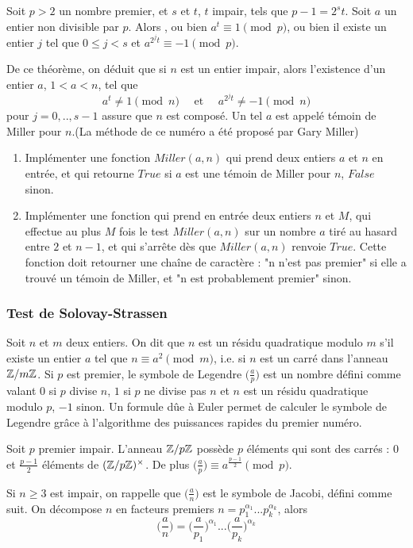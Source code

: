 \begin{thm} Soit $p>2$ un nombre premier, et $s$ et $t$, $t$ impair, tels que $p-1=2^s t $. Soit $a$ un entier non divisible par $p$. Alors , ou bien $a^t \equiv 1\pmod p$, ou bien il existe un entier $j$ tel que $0\leq j < s $ et $a^{2^j t} \equiv -1\pmod p$.
\end{thm}
De ce théorème, on déduit que si $n$ est un entier impair, alors l'existence d'un entier $a$, $1<a<n$, tel que 
\[a^t\neq 1\pmod n \quad\text{ et }\quad a^{2^j t}\neq -1\pmod n\]
pour $j=0,..,s-1$ assure que $n$ est composé. Un tel $a$ est appelé témoin de Miller pour $n$.(La méthode de ce numéro a été proposé par Gary Miller)
\begin{enumerate}
\item Implémenter une fonction $Miller(a,n)$ qui prend deux entiers $a$ et $n$ en entrée, et qui retourne $True$ si $a$ est une témoin de Miller pour $n$, $False$ sinon.
\item Implémenter une fonction qui prend en entrée deux entiers $n$ et $M$, qui effectue au plus $M$ fois le test $Miller(a,n)$ sur un nombre $a$ tiré au hasard entre $2$ et $n-1$, et qui s'arrête dès que $Miller(a,n)$ renvoie $True$. Cette fonction doit retourner une chaîne de caractère : "n n'est pas premier" si elle a trouvé un témoin de Miller, et "n est probablement premier" sinon.
\end{enumerate}

\subsubsection{Test de Solovay-Strassen}
Soit $n$ et $m$ deux entiers. On dit que $n$ est un résidu quadratique modulo $m$ s'il existe un entier $a$ tel que $n\equiv a^2\pmod m$, i.e. si $n$ est un carré dans l'anneau $\mathbb Z/m\mathbb Z$. Si $p$ est premier, le symbole de Legendre $\big(\frac{a}{p}\big)$ est un nombre défini comme valant $0$ si $p$ divise $n$, $1$ si $p$ ne divise pas $n$ et $n$ est un résidu quadratique modulo $p$, $-1$ sinon. Un formule dûe à Euler permet de calculer le symbole de Legendre grâce à l'algorithme des puissances rapides du premier numéro.

\begin{prop}[Euler]
Soit $p$ premier impair. L'anneau $\mathbb Z/p\mathbb Z$ possède $p$ éléments qui sont des carrés : $0$ et $\frac{p-1}{2}$ éléments de $(\mathbb Z/p\mathbb Z)^\times$. De plus $\big(\frac{a}{p}\big)\equiv a^{\frac{p-1}{2}}\pmod p$.
\end{prop}

Si $n\geq 3$ est impair, on rappelle que $\big(\frac{a}{n}\big)$ est le symbole de Jacobi, défini comme suit. On décompose $n$ en facteurs premiers $n=p_1^{\alpha_1}...p_k^{\alpha_k}$, alors 
\[\big(\frac{a}{n}\big)=\big(\frac{a}{p_1}\big)^{\alpha_1}...\big(\frac{a}{p_k}\big)^{\alpha_k}\]

